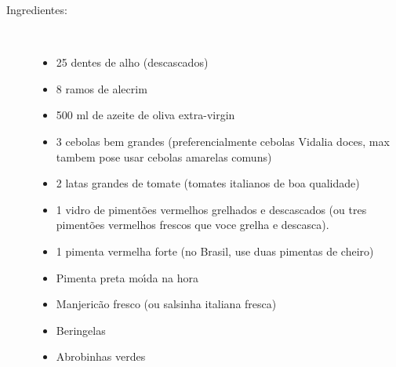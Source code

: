 \documentclass [11pt, letterpaper] {article}
\begin{document}
\begin{description}

\item[Ingredientes:]\ \\
	\begin{itemize}
	\item 25 dentes de alho (descascados) 
	\item 8 ramos de alecrim
	\item 500 ml de azeite de oliva extra-virgin
	\item 3 cebolas bem grandes (preferencialmente cebolas Vidalia doces, max tambem pose usar cebolas amarelas comuns) 
	\item 2 latas grandes de tomate (tomates italianos de boa qualidade)
	\item 1 vidro de piment\~oes vermelhos grelhados e descascados (ou tres piment\~oes  vermelhos frescos que voce grelha e descasca).
	\item 1 pimenta vermelha forte (no  Brasil, use duas pimentas de cheiro)
	\item Pimenta preta mo\'{\i}da na hora 
	\item Manjeric\~ao fresco (ou salsinha italiana fresca)
	\item Beringelas
	\item Abrobinhas verdes
	\end{itemize}


\end{description}
\end{document}
